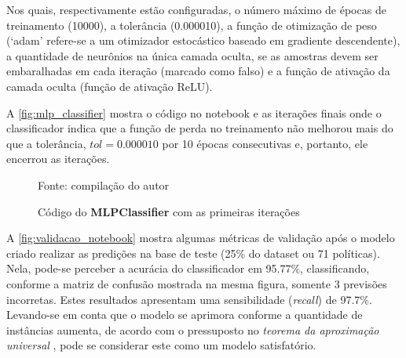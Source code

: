 Nos quais, respectivamente estão configuradas, o número máximo de épocas de treinamento (10000), a tolerância (0.000010), a função de otimização de peso (`adam' refere-se a um otimizador estocástico baseado em gradiente descendente), a quantidade de neurônios na única camada oculta, se as amostras devem ser embaralhadas em cada iteração (marcado como falso) e a função de ativação da camada oculta (função de ativação ReLU).

A \autoref{fig:mlp_classifier} mostra o código no notebook e as iterações finais onde o classificador indica que a função de perda no treinamento não melhorou mais do que a tolerância, $tol = 0.000010$ por 10 épocas consecutivas e, portanto, ele encerrou as iterações.

\begin{figure}[h]
	\centering
	\caption{Código do \textbf{MLPClassifier} com as primeiras iterações}
	
	\label{fig:mlp_classifier}
	{\scriptsize Fonte: compilação do autor}
\end{figure}

A \autoref{fig:validacao_notebook} mostra algumas métricas de validação após o modelo criado realizar as predições na base de teste (25\% do dataset ou 71 políticas). Nela, pode-se perceber a acurácia do classificador em 95.77\%, classificando, conforme a matriz de confusão mostrada na mesma figura, somente 3 previsões incorretas. Estes resultados apresentam uma sensibilidade (\textit{recall}) de 97.7\%. Levando-se em conta que o modelo se aprimora conforme a quantidade de instâncias aumenta, de acordo com o pressuposto no\textit{ teorema da aproximação universal} , pode se considerar este como um modelo satisfatório.

